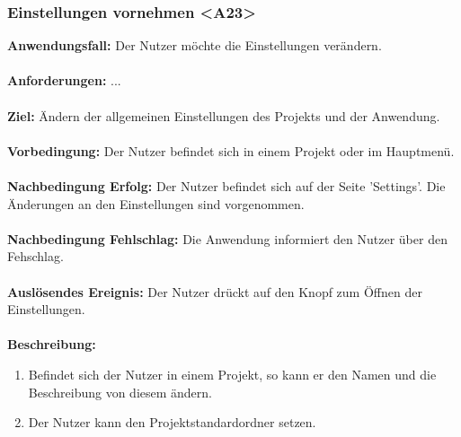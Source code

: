 \documentclass[parskip=full]{scrartcl} %
\begin{document}
\subsubsection*{Einstellungen vornehmen <A23>}
\textbf{Anwendungsfall:} Der Nutzer möchte die Einstellungen verändern.\\\\
\textbf{Anforderungen:} ...\\\\
\textbf{Ziel:} Ändern der allgemeinen Einstellungen des Projekts und der Anwendung. \\\\
\textbf{Vorbedingung:} Der Nutzer befindet sich in einem Projekt oder im Hauptmenü.\\\\
\textbf{Nachbedingung Erfolg:} Der Nutzer befindet sich auf der Seite 'Settings'. Die Änderungen an den Einstellungen sind vorgenommen. \\\\
\textbf{Nachbedingung Fehlschlag:} Die Anwendung informiert den Nutzer über den Fehschlag. \\\\
\textbf{Auslösendes Ereignis:} Der Nutzer drückt auf den Knopf zum Öffnen der Einstellungen. \\\\
\textbf{Beschreibung:}
\begin{enumerate}
    \item Befindet sich der Nutzer in einem Projekt, so kann er den Namen und die Beschreibung von diesem ändern.
    \item Der Nutzer kann den Projektstandardordner setzen.
\end{enumerate}
\newpage
\end{document}
